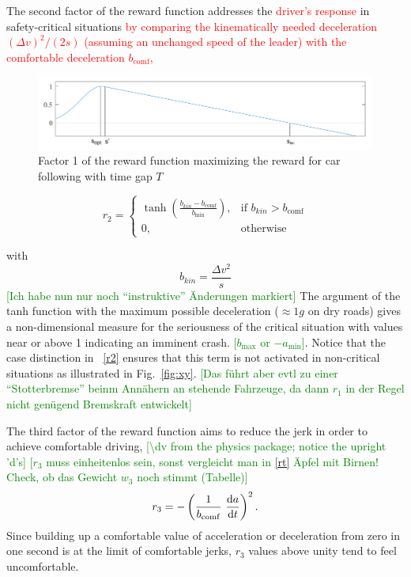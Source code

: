 \documentclass[review]{elsarticle}
\providecommand{\red}[1]{\textcolor{red}{#1}}
\providecommand{\green}[1]{\textcolor{green}{#1}}
\providecommand{\martin}[1]{\red{#1}} %
\providecommand{\martinc}[1]{\green{[#1]}} %
\providecommand{\sub}[1]{_{\mathrm{#1}}}  %
\providecommand{\3}{{\ss}}
\begin{document}
The second factor of the reward function addresses the \martin{driver's
  response} in safety-critical situations \martin{by comparing the
  kinematically needed deceleration $(\Delta v)^2/(2s)$ (assuming an
  unchanged speed of the leader) with the
  comfortable deceleration $b\sub{comf}$,}

\begin{figure}
	\centering
	\includegraphics[width=12cm]{images/RewardFunc1}
	\caption{Factor 1 of the reward function maximizing the reward
          for car following with time gap $T$} 
	\label{fig:RewardFunc1}
\end{figure}


\begin{equation}
\label{r2}
r_2 = 
\begin{cases}
\tanh\left(\frac{b_{kin}-b\sub{comf}}{b\sub{min}}\right),& \text{if } b_{kin}>b\sub{comf}\\
0,              & \text{otherwise}
\end{cases}
\end{equation}

with
\begin{equation}
b_{kin} = \frac{\Delta v^2}{s}
\end{equation}
\martinc{Ich habe nun nur noch ``instruktive'' \"Anderungen markiert}
The argument of the tanh function with  the
  maximum possible deceleration ($\approx 1 g$ on dry roads) gives a
  non-dimensional measure for the seriousness of the critical situation
  with values 
  near or above 1 indicating an imminent crash. \martinc{$b\sub{max}$
    or $-a\sub{min}$}. Notice that the case distinction in
~\eqref{r2}  ensures that
this term is not activated in non-critical situations as illustrated in Fig.~\ref{fig:xy}. \martinc{Das
    f\"uhrt aber evtl zu einer ``Stotterbremse'' beinm Ann\"ahern an
    stehende Fahrzeuge, da dann $r_1$ in der Regel nicht gen\"ugend
    Bremskraft entwickelt}

The third factor of the reward function aims to reduce the jerk in
order to achieve comfortable driving, \martinc{\textbackslash dv from
  the physics package; notice the upright 'd's}
\martinc{$r_3$ muss einheitenlos sein, sonst vergleicht man in
  \eqref{rt} \"Apfel mit Birnen! Check, ob das Gewicht $w_3$ noch
  stimmt (Tabelle)}
\begin{equation}
r_3 = -\left(\frac{1}{b\sub{comf}} \ \dv{a}{t}\right)^2.
\end{equation}
%
Since building up a comfortable value of acceleration or deceleration
from zero in one second is at the limit of comfortable jerks, $r_3$
values above unity tend to feel uncomfortable. 
\end{document}
